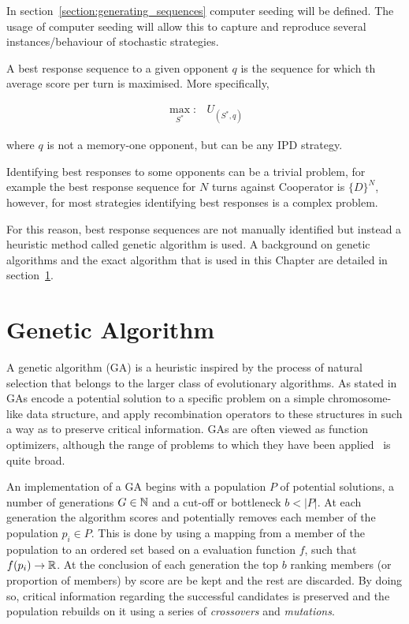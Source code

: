 In section~\ref{section:generating_sequences} computer seeding will be defined.
The usage of computer seeding will allow this to capture and reproduce
several instances/behaviour of stochastic strategies.

A best response sequence to a given opponent \(q\) is the sequence for which th
average score per turn is maximised. More specifically,

\begin{equation}\label{eq:best_response}
    \begin{aligned}
    \max_{S^*}: & U_{(S^*, q)}
    \end{aligned}
\end{equation}

where \(q\) is not a memory-one opponent, but can be any IPD strategy.

Identifying best responses to some opponents can be a trivial problem, for
example the best response sequence for \(N\) turns against Cooperator is
\(\{D\}^N\), however, for most strategies identifying best responses is a
complex problem.

For this reason, best response sequences are not manually identified but instead
a heuristic method called genetic algorithm is used. A background on genetic
algorithms and the exact algorithm that is used in this Chapter are detailed in
section~\ref{section:genetic_algorithm}.

\section{Genetic Algorithm}\label{section:genetic_algorithm}

A genetic algorithm (GA) is a heuristic inspired by the process of natural
selection that belongs to the larger class of evolutionary algorithms. As stated
in~\cite{Whitley1994} GAs encode a potential solution to a
specific problem on a simple chromosome-like data structure, and apply
recombination operators to these structures in such a way as to preserve
critical information. GAs are often viewed as function
optimizers, although the range of problems to which they have been
applied~\cite{Hou1994, Jones1997, Yang1998} is quite broad.

An implementation of a GA begins with a population \(P\) of
potential solutions, a number of generations \(G \in \mathbb{N}\) and a cut-off or
bottleneck \(b < |P|\). At each generation the algorithm scores and potentially
removes each member of the population \(p_i \in P\). This is done by using a
mapping from a member of the population to an ordered set based on a evaluation
function \(f\), such that \(f(p_i) \to \mathbb{R}\). At the conclusion of each
generation the top \(b\) ranking members (or proportion of members) by score are
be kept and the rest are discarded. By doing so, critical information regarding
the successful candidates is preserved and the population rebuilds on it using a
series of \textit{crossovers} and \textit{mutations}.

